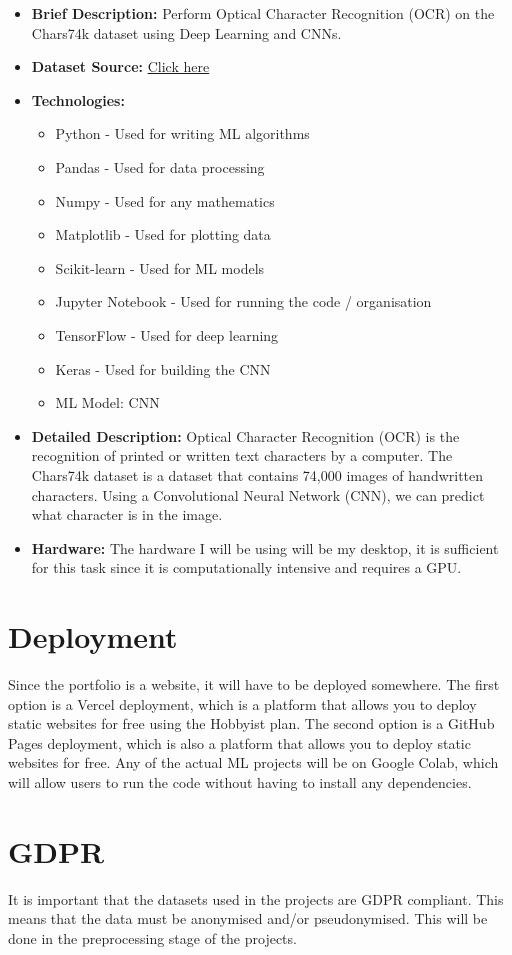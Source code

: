\documentclass{article}
\begin{document}
\begin{itemize}
    \item \textbf{Brief Description:} Perform Optical Character Recognition (OCR) on the Chars74k dataset using Deep Learning and CNNs.
    \item \textbf{Dataset Source:} \href{https://info-ee.surrey.ac.uk/CVSSP/demos/chars74k/}{Click here}
    \item \textbf{Technologies:}
    \begin{itemize}
        \item Python - Used for writing ML algorithms
        \item Pandas - Used for data processing
        \item Numpy - Used for any mathematics
        \item Matplotlib - Used for plotting data
        \item Scikit-learn - Used for ML models
        \item Jupyter Notebook - Used for running the code / organisation
        \item TensorFlow - Used for deep learning
        \item Keras - Used for building the CNN
        \item ML Model: CNN
    \end{itemize}
    \item \textbf{Detailed Description:} Optical Character Recognition (OCR) is the recognition of printed or written text characters by a computer.
    The Chars74k dataset is a dataset that contains 74,000 images of handwritten characters. Using a Convolutional Neural Network (CNN), we can predict what character is in the image.
    \item \textbf{Hardware:} The hardware I will be using will be my desktop, it is sufficient for this task since it is computationally intensive and requires a GPU.
\end{itemize}

\section{Deployment}    
Since the portfolio is a website, it will have to be deployed somewhere. The first option is a Vercel deployment, 
which is a platform that allows you to deploy static websites for free using the Hobbyist plan. 
The second option is a GitHub Pages deployment, which is also a platform that allows you to deploy static websites for free. 
Any of the actual ML projects will be on Google Colab, which will allow users to run the code without having to install any dependencies.

\section{GDPR}
It is important that the datasets used in the projects are GDPR compliant. This means that the data must be anonymised and/or pseudonymised.
This will be done in the preprocessing stage of the projects.
\end{document}
